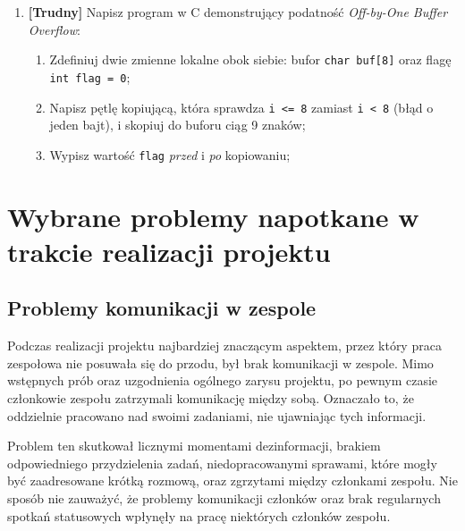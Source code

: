 \documentclass[12pt,a4paper]{article}
\begin{document}
\begin{enumerate}
\begin{tcolorbox}
\begin{verbatim}
void authenticate(char *input_pass) {
    int  authenticated = 0;
    char stored[16]    = "tajne123";
    char input[16];
 
    strcpy(input, input_pass);
 
    if (strcmp(input, stored) == 0)
        authenticated = 1;
 
    if (authenticated)
        printf("Dostep przyznany!\n");
    else
        printf("Bledne haslo.\n");
}
    \end{verbatim}
    \end{tcolorbox}
 
 
    \item \textbf{[Trudny]} Napisz program w C demonstrujący podatność
    \emph{Off-by-One Buffer Overflow}:
    \begin{enumerate}
        \item Zdefiniuj dwie zmienne lokalne obok siebie: bufor \texttt{char buf[8]} oraz flagę \texttt{int flag = 0};
        \item Napisz pętlę kopiującą, która sprawdza \texttt{i <= 8} zamiast \texttt{i < 8} (błąd o jeden bajt), i skopiuj do buforu ciąg 9 znaków;
        \item Wypisz wartość \texttt{flag} \emph{przed} i \emph{po} kopiowaniu;
    \end{enumerate}
 
\end{enumerate}

\section{Wybrane problemy napotkane w trakcie realizacji projektu}

\subsection{Problemy komunikacji w zespole}

Podczas realizacji projektu najbardziej znaczącym aspektem, przez który praca zespołowa nie posuwała się do przodu, był brak komunikacji w zespole. Mimo wstępnych prób oraz uzgodnienia ogólnego zarysu projektu, po pewnym czasie członkowie zespołu zatrzymali komunikację między sobą. Oznaczało to, że oddzielnie pracowano nad swoimi zadaniami, nie ujawniając tych informacji.

Problem ten skutkował licznymi momentami dezinformacji, brakiem odpowiedniego przydzielenia zadań, niedopracowanymi sprawami, które mogły być zaadresowane krótką rozmową, oraz zgrzytami między członkami zespołu. Nie sposób nie zauważyć, że problemy komunikacji członków oraz brak regularnych spotkań statusowych wpłynęły na pracę niektórych członków zespołu.
\end{document}
